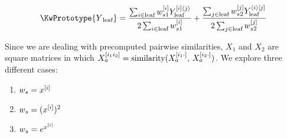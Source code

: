 \begin{equation}
    \KwPrototype{Y\textsubscript{leaf}}
    = \frac{
        \sum_{i\in \text{leaf}}
            w_{s1}\el i
            Y_\text{leaf}^{[i]\ang j}
    }{
        2\sum_{i\in \text{leaf}}
            w_{s1}\el i
    }
    +
    \frac{
        \sum_{j\in \text{leaf}}
            w_{s2}\el j
            Y_\text{leaf}^{\ang i[j]}
    }{
        2\sum_{j\in \text{leaf}}
            w_{s2}\el j
    }
    \label{eq:prototype3}
\end{equation}



Since we are dealing with precomputed pairwise similarities, $X_1$ and $X_2$ are square matrices in which $X_a^{[i_1i_2]} = \text{similarity}(X_a^{[i_1\cdot]},\, X_a ^{[i_2\cdot]})$. We explore three different cases:

\begin{enumerate}
    \item $w_s = x^{[i]}$
    \item $w_s = (x^{[i]} )^2$
    \item $w_s = e^{x^{[i]}}$
\end{enumerate}



